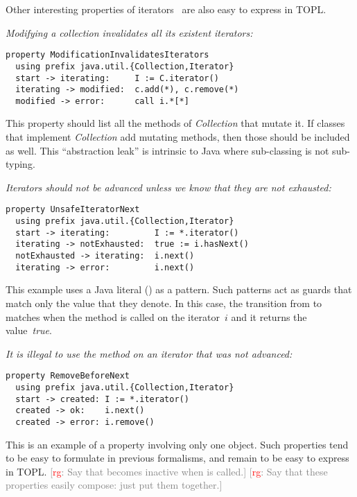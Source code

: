 \documentclass[preprint]{sigplanconf} %
\newcommand{\note}[2]{\textcolor{gray}{[\textcolor{red}{#1}: #2]}}
\newcommand{\rg}[1]{\note{rg}{#1}}
\theoremstyle{definition}
\theoremstyle{remark}
\begin{document}
Other interesting properties of iterators~\cite{dblp:conf/oopsla/naeeml08,dblp:conf/sigsoft/boddenlh08,haack2009} are also easy to express in TOPL\null.

\emph{Modifying a collection invalidates all its existent iterators:}
\par\medskip\noindent
\begin{Verbatim}
property ModificationInvalidatesIterators
  using prefix java.util.{Collection,Iterator}
  start -> iterating:     I := C.iterator()
  iterating -> modified:  c.add(*), c.remove(*)
  modified -> error:      call i.*[*]
\end{Verbatim}
\par\medskip\noindent This property should list all the methods of \textit{Collection} that mutate it.
If classes that implement \textit{Collection} add mutating methods, then those should be included as well.
This ``abstraction leak'' is intrinsic to Java where sub-classing is not sub-typing.

\emph{Iterators should not be advanced unless we know that they are not exhausted:}
\par\medskip\noindent
\begin{Verbatim}
property UnsafeIteratorNext
  using prefix java.util.{Collection,Iterator}
  start -> iterating:         I := *.iterator()
  iterating -> notExhausted:  true := i.hasNext()
  notExhausted -> iterating:  i.next()
  iterating -> error:         i.next()
\end{Verbatim}
\par\medskip
This example uses a Java literal (\Verb@true@) as a pattern.
Such patterns act as guards that match only the value that they denote.
In this case, the transition from \Verb@iterating@ to \Verb@notExhausted@ matches when the method \Verb@hasNext@ is called on the iterator~$i$ and it returns the value~\textit{true}.

\emph{It is illegal to use the \Verb@remove@ method on an iterator that was not advanced:}
\par\medskip\noindent
\begin{Verbatim}
property RemoveBeforeNext
  using prefix java.util.{Collection,Iterator}
  start -> created: I := *.iterator()
  created -> ok:    i.next()
  created -> error: i.remove()
\end{Verbatim}
\par\medskip


This is an example of a property involving only one object.
Such properties tend to be easy to formulate in previous formalisms, and remain to be easy to express in TOPL\null.
\rg{Say that \Verb@created@ becomes inactive when \Verb@next@ is called.}
\rg{Say that these properties easily compose: just put them together.}
\end{document}
